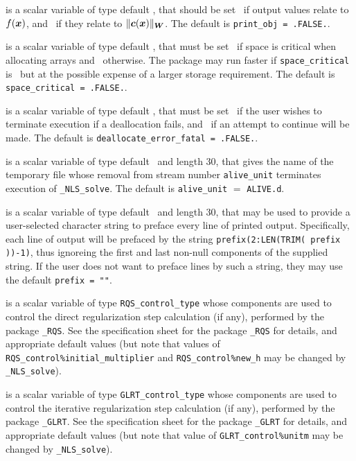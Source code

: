 \documentclass{galahad}
\newcommand{\packagename}{NLS}
\newcommand{\fullpackagename}{\libraryname\_\packagename}
\newcommand{\solver}{{\tt \fullpackagename\_solve}}
\begin{document}
\begin{description}
is a scalar variable of type default \logical,
that should be set \true\ if output values relate to $f({\bm{x}})$,
and \false\ if they relate to $\|{\bm{c}}({\bm{x}})\|_{{\bm{W}}}$.
The default is {\tt print\_obj = .FALSE.}.

 is a scalar variable of type default \logical,
that must be set \true\ if space is critical when allocating arrays
and  \false\ otherwise. The package may run faster if
{\tt space\_critical} is \false\ but at the possible expense of a larger
storage requirement. The default is {\tt space\_critical = .FALSE.}.

 is a scalar variable of type default \logical,
that must be set \true\ if the user wishes to terminate execution if
a deallocation  fails, and \false\ if an attempt to continue
will be made. The default is {\tt deallocate\_error\_fatal = .FALSE.}.

 is a scalar variable of type default \character\ and length
30, that gives the name of the temporary file whose removal from stream number
{\tt alive\_unit} terminates execution of \solver.
The default is {\tt alive\_unit} $=$ {\tt ALIVE.d}.

 is a scalar variable of type default \character\
and length 30, that may be used to provide a user-selected
character string to preface every line of printed output.
Specifically, each line of output will be prefaced by the string
{\tt prefix(2:LEN(TRIM( prefix ))-1)},
thus ignoreing the first and last non-null components of the
supplied string. If the user does not want to preface lines by such
a string, they may use the default {\tt prefix = ""}.

 is a scalar variable of type
{\tt RQS\_control\_type}
whose components are used to control the
direct regularization step calculation (if any),
performed by the package
{\tt \libraryname\_RQS}.
See the specification sheet for the package
{\tt \libraryname\_RQS}
for details, and appropriate default values
(but note that values of
{\tt RQS\_control\%init\-ial\_multiplier}
and
{\tt RQS\_control\%new\_h}
may be changed by \solver).

 is a scalar variable of type
{\tt GLRT\_control\_type}
whose components are used to control the
iterative regularization step calculation (if any),
performed by the package
{\tt \libraryname\_GLRT}.
See the specification sheet for the package
{\tt \libraryname\_GLRT}
for details, and appropriate default values
(but note that value of
{\tt GLRT\_control\%unitm}
may be changed by \solver).


\end{description}
\end{document}

